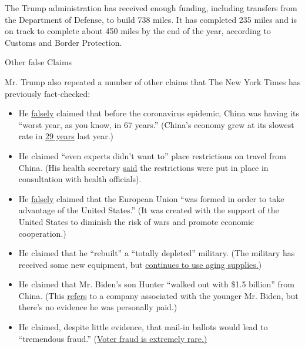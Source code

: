 The Trump administration has received enough funding, including
transfers from the Department of Defense, to build 738 miles. It has
completed 235 miles and is on track to complete about 450 miles by the
end of the year, according to Customs and Border Protection.

Other false Claims

Mr. Trump also repeated a number of other claims that The New York Times
has previously fact-checked:

\begin{itemize}
\item
  He
  \href{https://www.nytimes3xbfgragh.onion/2019/09/04/us/politics/fact-checking-trump-china.html}{falsely}
  claimed that before the coronavirus epidemic, China was having its
  ``worst year, as you know, in 67 years.'' (China's economy grew at its
  slowest rate in
  \href{https://www.ft.com/content/62524508-3825-11ea-a6d3-9a26f8c3cba4}{29
  years} last year.)
\item
  He claimed ``even experts didn't want to'' place restrictions on
  travel from China. (His health secretary
  \href{https://www.nytimes3xbfgragh.onion/interactive/2020/03/18/us/trump-coronavirus-statements-timeline.html}{said}
  the restrictions were put in place in consultation with health
  officials).
\item
  He
  \href{https://www.nytimes3xbfgragh.onion/2018/10/15/us/politics/fact-check-trump-european-union.html}{falsely}
  claimed that the European Union ``was formed in order to take
  advantage of the United States.'' (It was created with the support of
  the United States to diminish the risk of wars and promote economic
  cooperation.)
\item
  He claimed that he ``rebuilt'' a ``totally depleted'' military. (The
  military has received some new equipment, but
  \href{https://www.nytimes3xbfgragh.onion/2020/06/13/us/politics/fact-check-trump-military-west-point-speech.html}{continues
  to use aging supplies.})
\item
  He claimed that Mr. Biden's son Hunter ``walked out with \$1.5
  billion'' from China. (This
  \href{https://www.nytimes3xbfgragh.onion/2019/10/03/us/politics/hunter-biden-china.html}{refers}
  to a company associated with the younger Mr. Biden, but there's no
  evidence he was personally paid.)
\item
  He claimed, despite little evidence, that mail-in ballots would lead
  to ``tremendous fraud.''
  (\href{https://www.nytimes3xbfgragh.onion/article/mail-in-vote-fraud-ballot.html}{Voter
  fraud is extremely rare.)}
\end{itemize}

